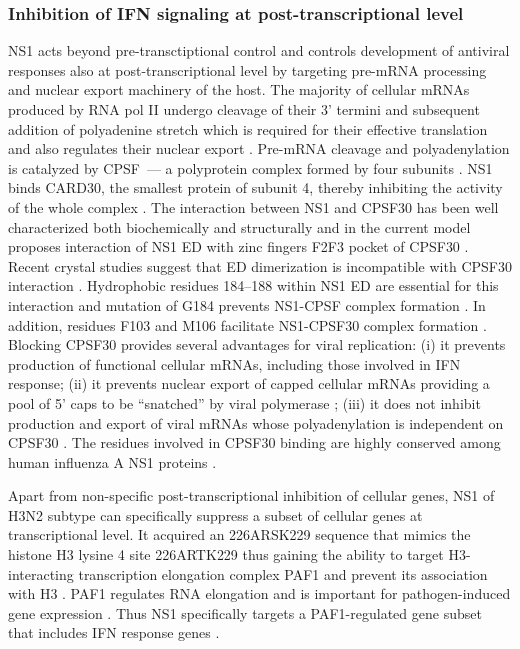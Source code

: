 		\subsubsection{Inhibition of IFN signaling at post-transcriptional level}
		
		NS1 acts beyond pre-transctiptional control and controls development of antiviral responses also at post-transcriptional level by targeting pre-mRNA processing and nuclear export machinery of the host.
		The majority of cellular mRNAs produced by RNA pol II undergo cleavage of their 3' termini and subsequent addition of polyadenine stretch which is required for their effective translation and also regulates their nuclear export \parencite{Vassalli1989, Zarkower1987, Huang1996}. Pre-mRNA cleavage and polyadenylation is catalyzed by \gls{CPSF}~--- a polyprotein complex formed by four subunits \parencite{Wilusz1990, Colgan1997}. NS1 binds \gls{CARD}30, the smallest protein of subunit 4, thereby inhibiting the activity of the whole complex \parencite{Nemeroff1998}. The interaction between NS1 and CPSF30 has been well characterized both biochemically and structurally and in the current model proposes interaction of NS1 ED with zinc fingers F2F3 pocket of \gls{CPSF}30 \parencite{Noah2003, Twu2006, Kochs2007, Das2008}. Recent crystal studies suggest that ED dimerization is incompatible with \gls{CPSF}30 interaction \parencite{Aramini2011, Kerry2011}. Hydrophobic residues 184--188 within NS1 ED are essential for this interaction and mutation of G184 prevents NS1-CPSF complex formation \parencite{Das2008}. In addition, residues F103 and M106 facilitate NS1-CPSF30 complex formation \parencite{Kochs2007, Das2008}. Blocking \gls{CPSF}30 provides several advantages for viral replication: (i) it prevents production of functional cellular mRNAs, including those involved in \gls{IFN} response; (ii) it prevents nuclear export of capped cellular mRNAs providing a pool of 5' caps to be ``snatched'' by viral polymerase \parencite{Nemeroff1998}; (iii) it does not inhibit production and export of viral mRNAs whose polyadenylation is independent on \gls{CPSF}30 \parencite{Plotch1977}. The residues involved in \gls{CPSF}30 binding are highly conserved among human influenza A NS1 proteins \parencite{Kochs2007, Das2008}.
		
		Apart from non-specific post-transcriptional inhibition of cellular genes, NS1 of H3N2 subtype can specifically suppress a subset of cellular genes at transcriptional level. It acquired an \textsc{226}ARSK\textsc{229} sequence that mimics the histone H3 lysine 4 site \textsc{226}ARTK\textsc{229} thus gaining the ability to target  H3-interacting transcription elongation complex PAF1 and prevent its association with H3 \parencite{Marazzi2012}. PAF1 regulates RNA elongation and is important for pathogen-induced gene expression \parencite{Newey2009}. Thus NS1 specifically targets a PAF1-regulated gene subset that includes \gls{IFN} response genes \parencite{Marazzi2012}.
		
